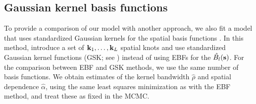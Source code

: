 \documentclass[aoas]{imsart}
\begin{document}
\subsection{Gaussian kernel basis functions}
\label{ebs:gskfunc}

To provide a comparison of our model with another approach, we also fit a model that uses standardized Gaussian kernels for the spatial basis functions \citep{Reich2012}.
In this method, \citeauthor{Reich2012} introduce a set of $\mathbf{k}_1, \ldots, \mathbf{k}_L$ spatial knots and use standardized Gaussian kernel functions (GSK; see ) instead of using EBFs for the $\hat{B_l}(\mathbf{s})$.
For the comparison between EBF and GSK methods, we use the same number of basis functions.
We obtain estimates of the kernel bandwidth $\hat{\rho}$ and spatial dependence $\hat{\alpha}$, using the same least squares minimization as with the EBF method, and treat these as fixed in the MCMC.
\end{document}
